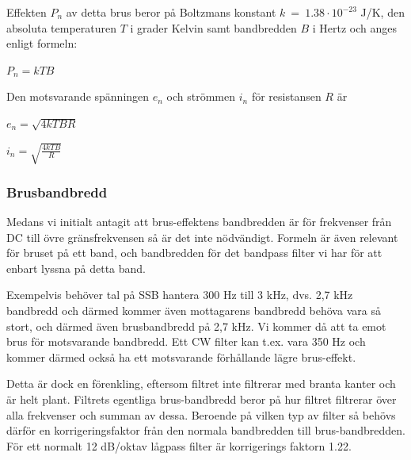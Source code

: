 Effekten \(P_n\) av detta brus beror på Boltzmans konstant
\(k\ =\ 1.38 \cdot 10^{-23}\) J/K, den absoluta temperaturen \(T\) i
grader Kelvin samt bandbredden \(B\) i Hertz och anges enligt formeln:

\(P_n = k T B\)

Den motsvarande spänningen \(e_n\) och strömmen \(i_n\) för resistansen \(R\) är

\(e_n = \sqrt{4kTBR}\)

\(i_n = \sqrt{\frac{4kTB}{R}}\)

\subsubsection{Brusbandbredd}

Medans vi initialt antagit att brus-effektens bandbredden är för frekvenser
från DC till övre gränsfrekvensen så är det inte nödvändigt. Formeln är även
relevant för bruset på ett band, och bandbredden för det bandpass filter vi har
för att enbart lyssna på detta band.

Exempelvis behöver tal på SSB hantera 300 Hz till 3 kHz, dvs. 2,7 kHz
bandbredd och därmed kommer även mottagarens bandbredd behöva vara så stort,
och därmed även brusbandbredd på 2,7 kHz. Vi kommer då att ta emot brus för
motsvarande bandbredd. Ett CW filter kan t.ex. vara 350 Hz och kommer därmed
också ha ett motsvarande förhållande lägre brus-effekt.

Detta är dock en förenkling, eftersom filtret inte filtrerar med branta kanter
och är helt plant. Filtrets egentliga brus-bandbredd beror på hur filtret
filtrerar över alla frekvenser och summan av dessa. Beroende på vilken typ av
filter så behövs därför en korrigeringsfaktor från den normala bandbredden
till brus-bandbredden. För ett normalt 12 dB/oktav lågpass filter är
korrigerings faktorn 1.22.

